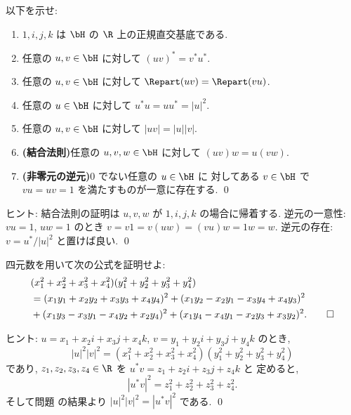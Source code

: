 \documentclass[12pt,twoside]{jarticle}
\begin{document}

\begin{question}
\label{q:quaternion-1}
  以下を示せ:
  \begin{enumerate}
  \item $1,i,j,k$ は $\bH$ の $\R$ 上の正規直交基底である.
  \item 任意の $u,v\in\bH$ に対して $(uv)^*=v^*u^*$.
  \item 任意の $u,v\in\bH$ に対して $\Repart(uv)=\Repart(vu)$.
  \item 任意の $u\in\bH$ に対して $u^*u=uu^*=|u|^2$.
  \item 任意の $u,v\in\bH$ に対して $|uv|=|u||v|$.
  \item {\bf (結合法則)}\quad 任意の $u,v,w\in\bH$ に対して $(uv)w=u(vw)$.
  \item {\bf (非零元の逆元)}\quad $0$ でない任意の $u\in\bH$ に
    対してある $v\in\bH$ で $vu=uv=1$ を満たすものが一意に存在する.
    \qed
  \end{enumerate}
\end{question}

\noindent
ヒント: 結合法則の証明は $u,v,w$ が $1,i,j,k$ の場合に帰着する.
逆元の一意性: $vu=1$, $uw=1$ のとき $v=v1=v(uw)=(vu)w=1w=w$.
逆元の存在: $v = u^*/|u|^2$ と置けば良い.
\qed


\begin{question}
  四元数を用いて次の公式を証明せよ:
  \begin{align*}
    &
    (x_1^2+x_2^2+x_3^2+x_4^2)(y_1^2+y_2^2+y_3^2+y_4^2)
    \\ &
    = (x_1y_1+x_2y_2+x_3y_3+x_4y_4)^2
    + (x_1y_2-x_2y_1-x_3y_4+x_4y_3)^2
    \\ &
    + (x_1y_3-x_3y_1-x_4y_2+x_2y_4)^2
    + (x_1y_4-x_4y_1-x_2y_3+x_3y_2)^2.
    \qed
  \end{align*}
\end{question}

\noindent
ヒント: $u=x_1+x_2i+x_3j+x_4k$, $v=y_1+y_2i+y_3j+y_4k$ のとき,
\begin{equation*}
  |u|^2|v|^2=(x_1^2+x_2^2+x_3^2+x_4^2)(y_1^2+y_2^2+y_3^2+y_4^2)
\end{equation*}
であり, $z_1,z_2,z_3,z_4\in\R$ を $u^*v=z_1+z_2i+z_3j+z_4k$ と
定めると, 
\begin{equation*}
  |u^*v|^2 = z_1^2 + z_2^2 + z_3^2 + z_4^2.
\end{equation*}
そして問題  の結果より $|u|^2|v|^2=|u^*v|^2$ である.
\qed
\end{document}
